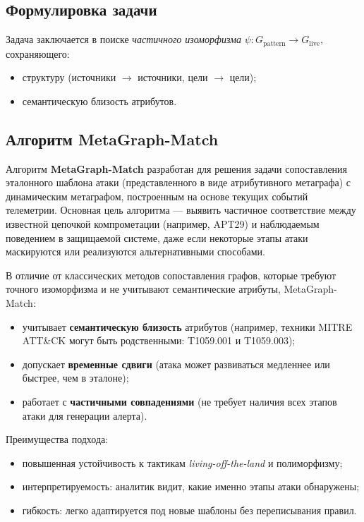 \documentclass{article}
\begin{document}
\subsection{Формулировка задачи}

Задача заключается в поиске \textit{частичного изоморфизма} $\psi: G_{\text{pattern}} \rightarrow G_{\text{live}}$, сохраняющего:

\noindent
\begin{itemize}
    \item структуру (источники $\rightarrow$ источники, цели $\rightarrow$ цели);
    \item семантическую близость атрибутов.
\end{itemize}
\subsection{Алгоритм MetaGraph-Match}

Алгоритм \textbf{MetaGraph-Match} разработан для решения задачи сопоставления эталонного шаблона атаки (представленного в виде атрибутивного метаграфа) с динамическим метаграфом, построенным на основе текущих событий телеметрии. Основная цель алгоритма — выявить частичное соответствие между известной цепочкой компрометации (например, APT29) и наблюдаемым поведением в защищаемой системе, даже если некоторые этапы атаки маскируются или реализуются альтернативными способами.

В отличие от классических методов сопоставления графов, которые требуют точного изоморфизма и не учитывают семантические атрибуты, MetaGraph-Match:

\noindent
\begin{itemize}
    \item учитывает \textbf{семантическую близость} атрибутов (например, техники MITRE ATT\&CK могут быть родственными: T1059.001 и T1059.003);
    \item допускает \textbf{временные сдвиги} (атака может развиваться медленнее или быстрее, чем в эталоне);
    \item работает с \textbf{частичными совпадениями} (не требует наличия всех этапов атаки для генерации алерта).
\end{itemize}

Преимущества подхода:

\noindent
\begin{itemize}
    \item повышенная устойчивость к тактикам \textit{living-off-the-land} и полиморфизму;
    \item интерпретируемость: аналитик видит, какие именно этапы атаки обнаружены;
    \item гибкость: легко адаптируется под новые шаблоны без переписывания правил.
\end{itemize}
\end{document}
